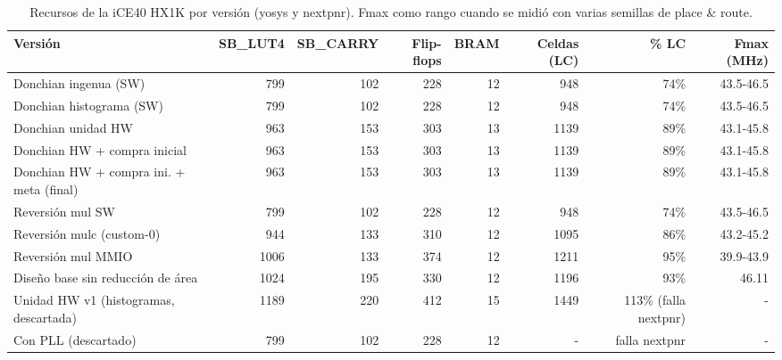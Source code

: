 \begin{table}[htbp]
\centering
\small
\begin{adjustbox}{max width=\linewidth}
\begin{tabular}{lrrrrrrr}
\toprule
Versión & SB\_LUT4 & SB\_CARRY & Flip-flops & BRAM & Celdas (LC) & \% LC & Fmax (MHz) \\
\midrule
Donchian ingenua (SW) & 799 & 102 & 228 & 12 & 948 & 74\% & 43.5-46.5 \\
Donchian histograma (SW) & 799 & 102 & 228 & 12 & 948 & 74\% & 43.5-46.5 \\
Donchian unidad HW & 963 & 153 & 303 & 13 & 1139 & 89\% & 43.1-45.8 \\
Donchian HW + compra inicial & 963 & 153 & 303 & 13 & 1139 & 89\% & 43.1-45.8 \\
Donchian HW + compra ini. + meta (final) & 963 & 153 & 303 & 13 & 1139 & 89\% & 43.1-45.8 \\
Reversión mul SW & 799 & 102 & 228 & 12 & 948 & 74\% & 43.5-46.5 \\
Reversión mulc (custom-0) & 944 & 133 & 310 & 12 & 1095 & 86\% & 43.2-45.2 \\
Reversión mul MMIO & 1006 & 133 & 374 & 12 & 1211 & 95\% & 39.9-43.9 \\
Diseño base sin reducción de área & 1024 & 195 & 330 & 12 & 1196 & 93\% & 46.11 \\
Unidad HW v1 (histogramas, descartada) & 1189 & 220 & 412 & 15 & 1449 & 113\% (falla nextpnr) & - \\
Con PLL (descartado) & 799 & 102 & 228 & 12 & - & falla nextpnr & - \\
\bottomrule
\end{tabular}
\end{adjustbox}
\caption{Recursos de la iCE40 HX1K por versión (yosys y nextpnr). Fmax como rango cuando se midió con varias semillas de place \& route.}
\end{table}
